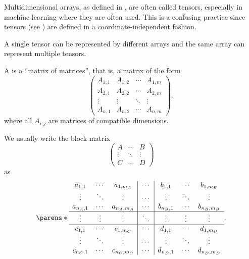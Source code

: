 \begin{remark}\label{rem:arrays_vs_tensors}
  Multidimensional arrays, as defined in , are often called tensors, especially in machine learning where they are often used. This is a confusing practice since tensors (see ) are defined in a coordinate-independent fashion.

  A single tensor can be represented by different arrays and the same array can represent multiple tensors.
\end{remark}

\begin{definition}\label{def:block_matrix}
  A  is a \enquote{matrix of matrices}, that is, a matrix of the form
  \begin{equation*}
    \begin{pmatrix}
      A_{1,1} & A_{1,2} & \cdots & A_{1,m} \\
      A_{2,1} & A_{2,2} & \cdots & A_{2,m} \\
      \vdots  & \vdots  & \ddots & \vdots  \\
      A_{n,1} & A_{n,2} & \cdots & A_{n,m}
    \end{pmatrix},
  \end{equation*}
  where all \( A_{i,j} \) are matrices of compatible dimensions.

  We usually write the block matrix
  \begin{equation*}
    \begin{pmatrix}
      A      & \cdots & B      \\
      \vdots & \ddots & \vdots \\
      C      & \cdots & D
    \end{pmatrix}
  \end{equation*}
  as
  \begin{equation*}
    \parens*{\begin{array}{ccc|c|ccc}
      a_{1,1}   & \cdots & a_{1,m_A}   & \cdots & b_{1,1}   & \cdots & b_{1,m_B} \\
      \vdots    & \ddots & \vdots      & \cdots & \vdots    & \ddots & \vdots \\
      a_{n_A,1} & \cdots & a_{n_A,m_A} & \cdots & b_{n_B,1} & \cdots & b_{n_B,m_B} \\
      \hline
      \vdots    & \vdots & \vdots      & \ddots & \vdots    & \vdots & \vdots \\
      \hline
      c_{1,1}   & \cdots & c_{1,m_C}   & \cdots & d_{1,1}   & \cdots & d_{1,m_D} \\
      \vdots    & \ddots & \vdots      & \cdots & \vdots    & \ddots & \vdots \\
      c_{n_C,1} & \cdots & c_{n_C,m_C} & \cdots & d_{n_D,1} & \cdots & d_{n_D,m_D} \\
    \end{array}}.
  \end{equation*}


\end{definition}
